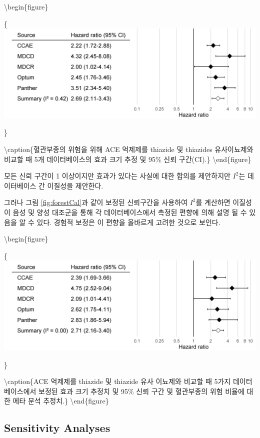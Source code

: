 \documentclass[11pt]{book}
\theoremstyle{definition}
\theoremstyle{definition}
\theoremstyle{definition}
\theoremstyle{remark}
\begin{document}
\textbackslash{}begin\{figure\}

\{\centering \includegraphics[width=0.9\linewidth]{images/MethodValidity/forest}

\}

\textbackslash{}caption\{혈관부종의 위험을 위해 ACE 억제제를 thiazide 및
thiazides 유사이뇨제와 비교할 때 5개 데이터베이스의 효과 크기 추정 및
95\% 신뢰 구간(CI).\}\label{fig:forest} \textbackslash{}end\{figure\}

모든 신뢰 구간이 1 이상이지만 효과가 있다는 사실에 대한 합의를
제안하지만 \(I^2\)는 데이터베이스 간 이질성을 제안한다.

그러나 그림 \ref{fig:forestCal}과 같이 보정된 신뢰구간을 사용하여
\(I^2\)를 계산하면 이질성이 음성 및 양성 대조군을 통해 각
데이터베이스에서 측정된 편향에 의해 설명 될 수 있음을 알 수 있다. 경험적
보정은 이 편향을 올바르게 고려한 것으로 보인다.

\textbackslash{}begin\{figure\}

\{\centering \includegraphics[width=0.9\linewidth]{images/MethodValidity/forestCal}

\}

\textbackslash{}caption\{ACE 억제제를 thiazide 및 thiazide 유사 이뇨제와
비교할 때 5가지 데이터베이스에서 보정된 효과 크기 추정치 및 95\% 신뢰
구간 및 혈관부종의 위험 비율에 대한 메타 분석 추정치.\}\label{fig:forestCal}
\textbackslash{}end\{figure\}

\subsection{Sensitivity Analyses}\label{sensitivity-analyses-1}
\end{document}
